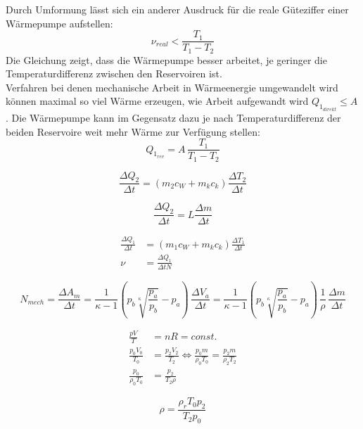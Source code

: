 Durch Umformung lässt sich ein anderer Ausdruck für die reale Güteziffer einer Wärmepumpe aufstellen:
\begin{equation}\label{eqn:guetezifferReal}
    ν_{real} < \frac{T_1}{T_1 - T_2}
\end{equation}
Die Gleichung zeigt, dass die Wärmepumpe besser arbeitet, je geringer die Temperaturdifferenz zwischen den 
Reservoiren ist.\\
Verfahren bei denen mechanische Arbeit in Wärmeenergie umgewandelt wird können maximal so viel Wärme erzeugen,
wie Arbeit aufgewandt wird $Q_{1_{direkt}} \leq A$. 
Die Wärmepumpe kann im Gegensatz dazu je nach Temperaturdifferenz der beiden Reservoire weit mehr Wärme
zur Verfügung stellen:
\begin{equation}
    Q_{1_{rev}} = A\, \frac{T_1}{T_1 - T_2}
\end{equation}


\begin{equation}\label{eqn:diffQ2}
    \frac{ΔQ_2}{Δt} = \left(m_2c_W + m_kc_k\right)\frac{ΔT_2}{Δt}
\end{equation}
   
\begin{equation}\label{eqn:verdampfungswaerme}
    \frac{ΔQ_2}{Δt} = L\frac{Δm}{Δt}
\end{equation}

\begin{align}
    \frac{ΔQ_1}{Δt} &= \left(m_1c_W + m_kc_k\right)\frac{ΔT_1}{Δt}\\
    ν &= \frac{ΔQ_1}{ΔtN}
\end{align}
  
  
\begin{equation}
    N_{mech} = \frac{ΔA_m}{Δt} = \frac{1}{κ - 1}\left(p_b\sqrt[κ]{\frac{p_a}{p_b}} - p_a\right) \, \frac{ΔV_a}{Δt} 
    = \frac{1}{κ - 1}\left(p_b\sqrt[κ]{\frac{p_a}{p_b}} - p_a\right)\,\frac{1}{ρ}\,\frac{Δm}{Δt}
\end{equation}
  

\begin{align}
    \frac{pV}{T} &= nR = const.\\
    \frac{p_0V_0}{T_0} &= \frac{p_2V_2}{T_2} \Leftrightarrow \frac{p_0m}{ρ_0T_0} = \frac{p_2m}{ρ_2T_2}\\
    \frac{p_0}{ρ_0T_0} &= \frac{p_2}{T_2ρ} 
\end{align}

\begin{equation}\label{eqn:roh}
    ρ = \frac{ρ_rT_0p_2}{T_2p_0}
\end{equation}